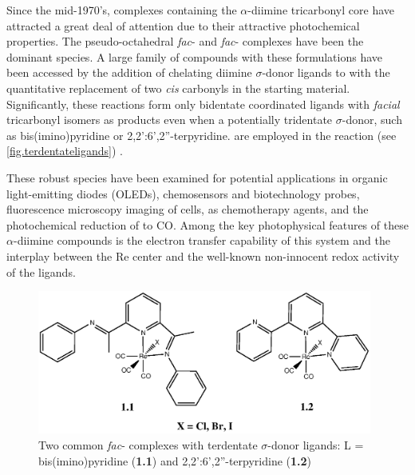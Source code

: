 Since the mid-1970's, complexes containing the $\alpha$-diimine  tricarbonyl core have attracted a great deal of attention due to their attractive photochemical properties. The pseudo-octahedral \textit{fac}-\ce{[L2Re(CO)3X]} and \textit{fac}-\ce{[L2(L$'$)Re(CO)3]+} complexes have been the dominant species\autocite{giordano1979, fredericks1979, sacksteder1990, caspar1983, yam2001, feliz1998, ruiz1996, lin1992, hino1992, walters2002, striplin2001}. A large family of compounds with these formulations have been accessed by the addition of chelating diimine $\sigma$-donor ligands to \ce{[Re(CO)5X]} with the quantitative replacement of two \textit{cis} carbonyls in the  starting material\autocite{giordano1979, martin2011, abel1959, kirkham1965, zingales1967, gamelin1994, marti2005, morse1976, giordano1978}. Significantly, these reactions form only bidentate coordinated ligands with \textit{facial} tricarbonyl isomers as products even when a potentially tridentate $\sigma$-donor, such as bis(imino)pyridine or 2,2':6',2''-terpyridine. are employed in the reaction (see \autoref{fig.terdentateligands}) \autocite{granifo1999, orrell1997, abel1993, potgieter2013}. 

These robust species have been examined for potential applications in organic light-emitting diodes (OLEDs)\autocite{gong1998, yu2013}, chemosensors and biotechnology probes\autocite{lo2010, lin2007, slone1995, beer1999, beer2003}, fluorescence microscopy imaging of cells\autocite{lo2010, amoroso2008, amoroso2007}, as chemotherapy agents\autocite{gimeno2014}, and the photochemical reduction of  to CO\autocite{hawecker1983, hawecker1986, takeda2010, christensen1992, sullivan1985}. Among the key photophysical features of these $\alpha$-diimine  compounds is the electron transfer capability of this system and the interplay between the Re center and the well-known non-innocent redox activity of the ligands\autocite{caulton2012, lyaskovskyy2012}.

\begin{figure}[!htbp]
 \begin{center}
  \includegraphics[clip=true, width=110mm]{images/terdentateligands.eps}
 \end{center}
\caption[Two common bidentate complexes using terdentate ligands]{Two common \textit{fac}-\ce{[L2Re(CO)3X]} complexes with terdentate $\sigma$-donor ligands: L = bis(imino)pyridine (\textbf{1.1}) and 2,2':6',2''-terpyridine (\textbf{1.2})}
\label{fig.terdentateligands}
\end{figure}

